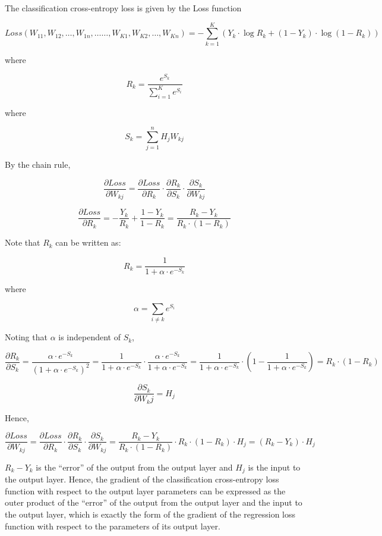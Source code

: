 \documentclass[10pt]{amsart}
\begin{document}
\begin{appendices}
The classification cross-entropy loss is given by the Loss function

$$Loss(W_{11}, W_{12}, \ldots, W_{1n}, \ldots \ldots, W_{K1}, W_{K2}, \ldots, W_{Kn}) = - \sum_{k=1}^K (Y_k \cdot \log R_k + (1 - Y_k) \cdot \log (1 - R_k))$$

where

$$R_k  = \frac {e^{S_k}} {\sum_{i=1}^K e^{S_i}}$$

where

$$S_k = \sum_{j=1}^n H_j W_{kj}$$

By the chain rule,

$$\frac {\partial Loss}{\partial W_{kj}} = \frac {\partial Loss}{\partial R_k} \cdot \frac {\partial R_k}{\partial S_k} \cdot \frac {\partial S_k} {\partial W_{kj}}$$

$$\frac {\partial Loss}{\partial R_k} = - \frac {Y_k} {R_k} + \frac {1 - Y_k} {1 - R_k} = \frac {R_k - Y_k} {R_k \cdot (1 - R_k)}$$

Note that $R_k$ can be written as:

$$R_k = \frac {1} {1 + \alpha \cdot e^{-S_k}}$$

where

$$\alpha = \sum_{i \neq k} e^{S_i}$$

Noting that $\alpha$ is independent of $S_k$,

$$\frac {\partial R_k} {\partial S_k} = \frac {\alpha \cdot e^{-S_k}} {(1 + \alpha \cdot e^{-S_k})^2} = \frac {1} {1 + \alpha \cdot e^{-S_k}} \cdot \frac {\alpha \cdot e^{-S_k}} {1 + \alpha \cdot e^{-S_k}} = \frac {1} {1 + \alpha \cdot e^{-S_k}} \cdot (1 - \frac {1} {1 + \alpha \cdot e^{-S_k}}) = R_k \cdot (1 - R_k)$$

$$\frac {\partial S_k} {\partial W_kj} = H_j$$

Hence,

$$\frac {\partial Loss}{\partial W_{kj}} = \frac {\partial Loss}{\partial R_k} \cdot \frac {\partial R_k}{\partial S_k} \cdot \frac {\partial S_k} {\partial W_{kj}} = \frac {R_k - Y_k} {R_k \cdot (1 - R_k)} \cdot R_k \cdot (1 - R_k) \cdot H_j = (R_k - Y_k) \cdot H_j$$

$R_k - Y_k$ is the ``error'' of the output from the output layer and $H_j$ is the input to the output layer. Hence, the gradient of the classification cross-entropy loss function with respect to the  output layer parameters can be expressed as the outer product of the ``error'' of the output from the output layer and the input to the output layer, which is exactly the form of the gradient of the regression loss function with respect to the parameters of its output layer.


\end{appendices}
\end{document}
